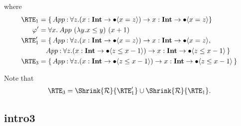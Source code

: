 \documentclass[acmsmall,review,anonymous]{acmart}\settopmatter{printfolios=true,printccs=false,printacmref=false}
\begin{document}
where
\begin{align*}
    \RTE_1 &= \{\, App\COL \forall z. (\ti{x} \to \tb{x = z}) \to \ti{x} \to
    \tb{x = z} \} \\
    \pdrtop' &= \forall x.\: App\ (\lambda y. x \leq y)\ (x + 1) \\
    \RTE_1' &= \{\, App\COL \forall z. (\ti{x} \to \tb{x = z}) \to \ti{x} \to
    \tb{x = z}, \\
    & \quad App \COL \forall z. (\ti{x} \to \tb{z \leq x - 1}) \to \ti{x} \to \tb{z \leq
    x - 1} \, \} \\
    \RTE_3 &= \{\, App \COL \forall z. (\ti{x} \to \tb{z \leq x - 1}) \to \ti{x}
    \to \tb{z \leq x - 1} \, \} \\
\end{align*}

Note that
\begin{align*}
    \RTE_3 = \Shrink{\RULES}{\RTE_1'} \cup \Shrink{\RULES}{\RTE_1}.
\end{align*}


\subsection{intro3}
\end{document}

